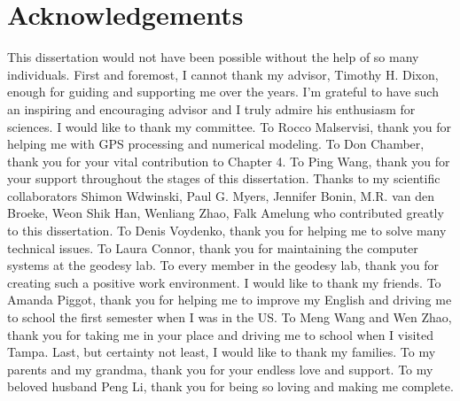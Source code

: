 \chapter*{Acknowledgements}
\thispagestyle{empty}
\doublespacing
This dissertation would not have been possible without the help of so many individuals.  First and foremost, I cannot thank my advisor, Timothy H. Dixon, enough for guiding and supporting me over the years.  I’m grateful to have such an inspiring and encouraging advisor and I truly admire his enthusiasm for sciences. I would like to thank my committee.  To Rocco Malservisi, thank you for helping me with GPS processing and numerical modeling.  To Don Chamber, thank you for your vital contribution to Chapter 4.  To Ping Wang, thank you for your support throughout the stages of this dissertation.
Thanks to my scientific collaborators Shimon Wdwinski, Paul G. Myers, Jennifer Bonin, M.R. van den Broeke, Weon Shik Han, Wenliang Zhao, Falk Amelung who contributed greatly to this dissertation.  To Denis Voydenko, thank you for helping me to solve many technical issues.  To Laura Connor, thank you for maintaining the computer systems at the geodesy lab.  To every member in the geodesy lab, thank you for creating such a positive work environment.
I would like to thank my friends.  To Amanda Piggot, thank you for helping me to improve my English and driving me to school the first semester when I was in the US.  To Meng Wang and Wen Zhao, thank you for taking me in your place and driving me to school when I visited Tampa.
Last, but certainty not least, I would like to thank my families. To my parents and my grandma, thank you for your endless love and support.   To my beloved husband Peng Li, thank you for being so loving and making me complete.  
